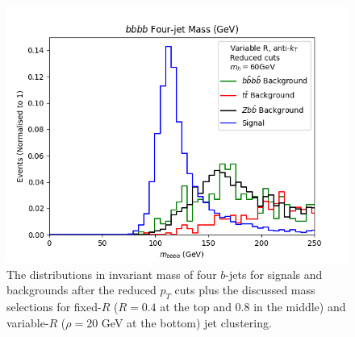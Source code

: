 \documentclass[12pt]{article}
\begin{document}
\begin{figure}[t!]
    \includegraphics[scale=0.5]{plots/Background/bbbb_mass_60gev_rho20.png}
	\caption{The distributions in invariant mass of four $b$-jets for signals and backgrounds after the reduced $p_T$ cuts plus the discussed mass selections
for fixed-$R$ ($R=0.4$ at the top and 0.8 in the middle) and variable-$R$ ($\rho=20$ GeV at the bottom) jet clustering.}
\label{fig:inv_mass1234_bkvs_fixedR}
\end{figure}
\end{document}
